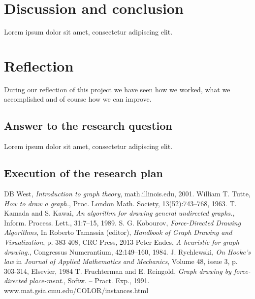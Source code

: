 \documentclass[a4paper,12pt]{article}
\begin{document}
\section{Discussion and conclusion}
Lorem ipsum dolor sit amet, consectetur adipiscing elit.

\section{Reflection}
During our reflection of this project we have seen how we worked, what we accomplished and of course how we can improve. 
\subsection{Answer to the research question}
Lorem ipsum dolor sit amet, consectetur adipiscing elit.
\subsection{Execution of the research plan}


\begin{thebibliography}{99}
DB West, \emph{Introduction to graph theory}, math.illinois.edu, 2001.
William T. Tutte, \emph{How to draw a graph.}, Proc. London Math. Society, 13(52):743–768, 1963.
T. Kamada and S. Kawai, \emph{An algorithm for drawing general undirected graphs.}, Inform. Process. Lett., 31:7–15, 1989.
S. G. Kobourov, \emph{Force-Directed Drawing Algorithms}, In Roberto Tamassia (editor), \emph{Handbook of Graph Drawing and Visualization}, p. 383-408, CRC Press, 2013
 Peter Eades, \emph{A heuristic for graph drawing.}, Congressus Numerantium, 42:149–160, 1984.
 J. Rychlewski, \emph{On Hooke's law} in \emph{Journal of Applied Mathematics and Mechanics}, Volume 48, issue 3, p. 303-314, Elsevier, 1984
T. Fruchterman and E. Reingold, \emph{Graph drawing by force-directed place-ment.}, Softw. – Pract. Exp., 1991.
 www.mat.gsia.cmu.edu/COLOR/instances.html
\end{thebibliography}
\end{document}
